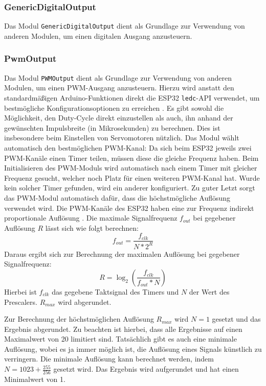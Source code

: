 \subsubsection{GenericDigitalOutput}
Das Modul \texttt{GenericDigitalOutput} dient als Grundlage zur Verwendung von anderen Modulen,
um einen digitalen Ausgang anzusteuern.

\subsubsection{PwmOutput}
Das Modul \texttt{PWMOutput} dient als Grundlage zur Verwendung von anderen Modulen,
um einen PWM-Ausgang anzusteuern.
%
Hierzu wird anstatt den standardmäßigen Arduino-Funktionen
direkt die ESP32 \texttt{ledc}-API verwendet,
um bestmögliche Konfigurationsoptionen zu erreichen \cite{esp32-ledc}. %
%
Es gibt sowohl die Möglichkeit,
den Duty-Cycle direkt einzustellen als auch,
ihn anhand der gewünschten Impulsbreite (in Mikrosekunden) zu berechnen.
%
Dies ist insbesondere beim Einstellen von Servomotoren nützlich.
%
Das Modul wählt automatisch den bestmöglichen PWM-Kanal:
%
Da sich beim ESP32 jeweils zwei PWM-Kanäle einen Timer teilen,
müssen diese die gleiche Frequenz haben.
%
Beim Initialisieren des PWM-Moduls wird automatisch nach einem Timer mit gleicher Frequenz gesucht,
welcher noch Platz für einen weiteren PWM-Kanal hat.
%
Wurde kein solcher Timer gefunden,
wird ein anderer konfiguriert.
%
Zu guter Letzt sorgt das PWM-Modul automatisch dafür,
dass die höchstmögliche Auflösung verwendet wird.
%
Die PWM-Kanäle des ESP32 haben eine zur Frequenz indirekt proportionale Auflösung \cite{esp32-technical-reference}.
Die maximale Signalfrequenz $f_{out}$ bei gegebener Auflösung $R$ lässt sich wie folgt berechnen:
\begin{equation}
    f_{out} = \frac{f_{clk}}{N*2^{R}}
\end{equation}
Daraus ergibt sich zur Berechnung der maximalen Auflösung bei gegebener Signalfrequenz:
\begin{equation}
    R = \log_2\left( \frac{f_{clk}}{f_{out}*N} \right)
\end{equation}
Hierbei ist $f_{clk}$ das gegebene Taktsignal des Timers und $N$ der Wert des Prescalers.
%
$R_{max}$ wird abgerundet.

Zur Berechnung der höchstmöglichen Auflösung $R_{max}$ wird $N=1$ gesetzt und das Ergebnis abgerundet.
%
Zu beachten ist hierbei,
dass alle Ergebnisse auf einen Maximalwert von 20 limitiert sind.
%
Tatsächlich gibt es auch eine minimale Auflösung,
wobei es ja immer möglich ist,
die Auflösung eines Signals künstlich zu verringern.
%
Die minimale Auflösung kann berechnet werden, indem $N=1023+\frac{255}{256}$ gesetzt wird.
Das Ergebnis wird aufgerundet und hat einen Minimalwert von 1.

